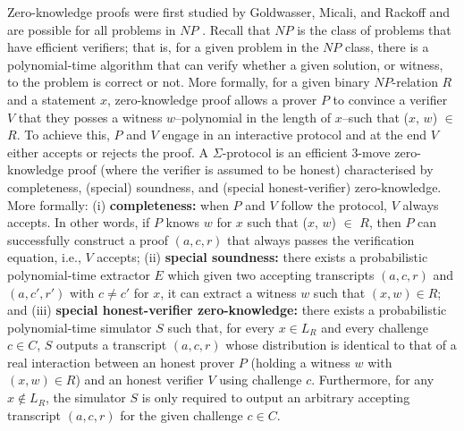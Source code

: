Zero-knowledge proofs were first studied by Goldwasser, Micali, and Rackoff \cite{10.1145/22145.22178} and 
are possible for all problems in $NP$ \cite{10.1145/116825.116852}. Recall that $NP$ is the class of 
problems that have efficient verifiers; that is, for a given problem in the $NP$ class, there is 
a polynomial-time algorithm that can verify whether a given solution, or witness, to the problem is correct or not.
More formally, for a given binary $NP$-relation $R$ and a statement $x$, zero-knowledge proof allows a prover 
$P$ to convince a verifier $V$ that they posses a witness $w$--polynomial in the length of $x$--such 
that ($x$, $w$) $\in$ $R$. To achieve this, $P$ and $V$ engage in an 
interactive protocol and at the end $V$ either accepts or rejects the proof.
A $\Sigma$-protocol is an efficient 3-move zero-knowledge proof (where the 
verifier is assumed to be honest) characterised by completeness, (special) soundness, and 
(special honest-verifier) zero-knowledge. More formally: (i) \textbf{completeness:}
  when $P$ and $V$ follow the protocol, $V$ always accepts. 
  In other words, if $P$ knows $w$ for $x$ such that ($x$, $w$) $\in$ $R$,  
  then $P$ can successfully construct a proof $(a, c, r)$ that always passes the verification equation, 
  i.e., $V$ accepts; (ii) \textbf{special soundness:}
there exists a probabilistic polynomial-time extractor $E$ which given 
two accepting transcripts $(a, c, r)$ and $(a, c', r')$ with $c\neq c'$ for $x$, 
it can extract a witness $w$ such that $(x, w) \in R$; and (iii) \textbf{special honest-verifier zero-knowledge:}
there exists a probabilistic polynomial-time simulator \(S\) such that, for every \(x \in L_R\) and every challenge \(c \in C\), \(S\) outputs a transcript \((a,c,r)\) whose distribution is identical to that of a real interaction between an honest prover \(P\) (holding a witness \(w\) with \((x,w)\in R\)) and an honest verifier \(V\) using challenge $c$. Furthermore, for any \(x \notin L_R\), the simulator \(S\) is only required to output an arbitrary accepting transcript \((a,c,r)\) for the given challenge \(c \in C\).


